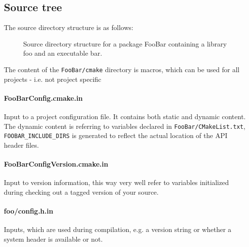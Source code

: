 \documentclass[12pt,a4wide]{article}
\begin{document}
\subsection{Source tree}
The source directory structure is as follows:
\begin{figure}[htbp]
\begin{center}
\begin{minipage}[c]{.9\columnwidth }
  \centering
{}
\end{minipage}
\end{center}
\caption{Source directory structure for a package {\ttfamily FooBar}
  containing a library {\ttfamily foo} and an executable {\ttfamily bar}.}
\label{fig:foo_directory}
\end{figure}

The content of the \lstinline{FooBar/cmake} directory is macros, which
can be used for all projects - i.e. not project specific
\paragraph{\ttfamily FooBarConfig.cmake.in} Input to a project configuration file. It
  contains both static and dynamic content. The dynamic content is
  referring to variables declared in \lstinline{FooBar/CMakeList.txt},
  \lstinline{FOOBAR_INCLUDE_DIRS} is generated to reflect the actual
  location of the API header files.

\paragraph{\ttfamily FooBarConfigVersion.cmake.in} Input to version
  information, this way very well refer to variables initialized
  during checking out a tagged version of your source.
\paragraph{\ttfamily foo/config.h.in} Inputs, which are used during
  compilation, e.g. a version string or whether a system header is
  available or not.
\end{document}
